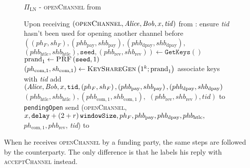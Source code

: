   \begin{figure}[H]
    \begin{protocolbox}{$\Pi_{\mathrm{LN}}$ - \textsc{openChannel} from
    \environment}
      \begin{algorithmic}[1]
        \State Upon receiving $\left(\textsc{openChannel}, \mathit{Alice}, \mathit{Bob}, x,
        \mathit{tid}\right)$ from \environment:
        \Indent
          \State ensure \textit{tid} hasn't been used for opening another
          channel before
          \label{alg:protocol:open:env:valid}
          \State $\left(\left(ph_F, sh_F\right), \left(phb_{\mathrm{pay}},
          shb_{\mathrm{pay}}\right), \left(phb_{\mathrm{dpay}},
          shb_{\mathrm{dpay}}\right),\right.$ $\left.\left(phb_{\mathrm{htlc}},
          shb_{\mathrm{htlc}}\right), \mathtt{seed}, \left(phb_{\mathrm{rev}},
          shb_{\mathrm{rev}}\right)\right) \gets \texttt{GetKeys}\left(\right)$
          \State $\mathrm{prand}_1 \gets \textsc{PRF}\left(\mathtt{seed},
          1\right)$
          \label{alg:protocol:open:env:prf}
          \State $\left(ph_{\mathrm{com}, 1}, sh_{\mathrm{com}, 1}\right) \gets
          \textsc{KeyShareGen}\left(1^k; \mathrm{prand}_1\right)$
          \State associate keys with \textit{tid}
          \State add $\left(\mathit{Alice}, \mathit{Bob}, x, \mathtt{tid}, \left(ph_F,
          sh_F\right), \left(phb_{\mathrm{pay}}, shb_{\mathrm{pay}}\right),
          \left(phb_{\mathrm{dpay}}, shb_{\mathrm{dpay}}\right)\right.$
          $\left.\left(phb_{\mathrm{htlc}}, shb_{\mathrm{htlc}}\right),
          \left(phb_{\mathrm{com}, 1}, shb_{\mathrm{com}, 1}\right),\right.$
          $\left.\left(phb_{\mathrm{rev}}, shb_{\mathrm{rev}}\right),
          \mathit{tid}\right)$ to \texttt{pendingOpen}
          \label{alg:protocol:open:env:pendingOpen}
          \State send (\textsc{openChannel}, $x, \mathtt{delay} + \left(2 + r\right)\texttt{windowSize},
          ph_F, phb_{\mathrm{pay}}, phb_{\mathrm{dpay}}, phb_{\mathrm{htlc}},$
          $ph_{\mathrm{com}, 1}, phb_{\mathrm{rev}}$, \textit{tid}) to \bob{}
        \EndIndent
      \end{algorithmic}
    \end{protocolbox}
    \caption{}
    \label{alg:protocol:open:env}
  \end{figure}

  When he receives \textsc{openChannel} by a funding party, the same steps are
  followed by the counterparty. The only difference is that he labels his reply
  with \textsc{acceptChannel} instead.

